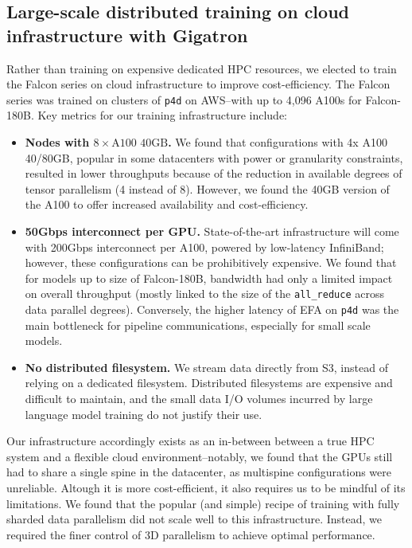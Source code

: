 \documentclass{article}
\begin{document}
\subsection{Large-scale distributed training on cloud infrastructure with Gigatron}

Rather than training on expensive dedicated HPC resources, we elected to train the Falcon series on cloud infrastructure to improve cost-efficiency. The Falcon series was trained on clusters of \texttt{p4d} on AWS--with up to 4,096 A100s for Falcon-180B. Key metrics for our training infrastructure include:
\begin{itemize}
    \item \textbf{Nodes with $8 \times \text{A100 40GB}$.} We found that configurations with 4x A100 40/80GB, popular in some datacenters with power or granularity constraints, resulted in lower throughputs because of the reduction in available degrees of tensor parallelism (4 instead of 8). However, we found the 40GB version of the A100 to offer increased availability and cost-efficiency.
    \item \textbf{50Gbps interconnect per GPU.} State-of-the-art infrastructure will come with 200Gbps interconnect per A100, powered by low-latency InfiniBand; however, these configurations can be prohibitively expensive. We found that for models up to size of Falcon-180B, bandwidth had only a limited impact on overall throughput (mostly linked to the size of the \texttt{all\_reduce} across data parallel degrees). Conversely, the higher latency of EFA on \texttt{p4d} was the main bottleneck for pipeline communications, especially for small scale models.
    \item \textbf{No distributed filesystem.} We stream data directly from S3, instead of relying on a dedicated filesystem. Distributed filesystems are expensive and difficult to maintain, and the small data I/O volumes incurred by large language model training do not justify their use.
\end{itemize}

Our infrastructure accordingly exists as an in-between between a true HPC system and a flexible cloud environment--notably, we found that the GPUs still had to share a single spine in the datacenter, as multispine configurations were unreliable.  Altough it is more cost-efficient, it also requires us to be mindful of its limitations. We found that the popular (and simple) recipe of training with fully sharded data parallelism \citep{zero-msft} did not scale well to this infrastructure. Instead, we required the finer control of 3D parallelism \citep{megatron-2} to achieve optimal performance. 
\end{document}
